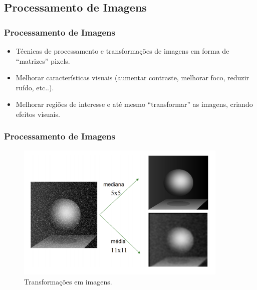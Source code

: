 \documentclass{beamer}
\begin{document}

\subsection{Processamento de Imagens}
\begin{frame}
\frametitle{Processamento de Imagens}

\begin{block}

		\begin{itemize}
			\item<1-> Técnicas de processamento e transformações de imagens em forma de ``matrizes'' pixels.
		\end{itemize}
\end{block}

\begin{block}

		\begin{itemize}
			\item Melhorar características visuais (aumentar contraste, melhorar foco, reduzir ruído, etc..).
			\item Melhorar regiões de interesse e até mesmo ``transformar'' as imagens, criando efeitos visuais.
		\end{itemize}
\end{block}

\end{frame}





\begin{frame}
\frametitle{Processamento de Imagens}
	
	\begin{figure}[!h]
		\begin{center}
			\includegraphics[width=0.9\textwidth]{Figures/pi}
			\caption{Transformações em imagens.}
		\end{center}
		
	\end{figure}
	

\end{frame}
\end{document}
